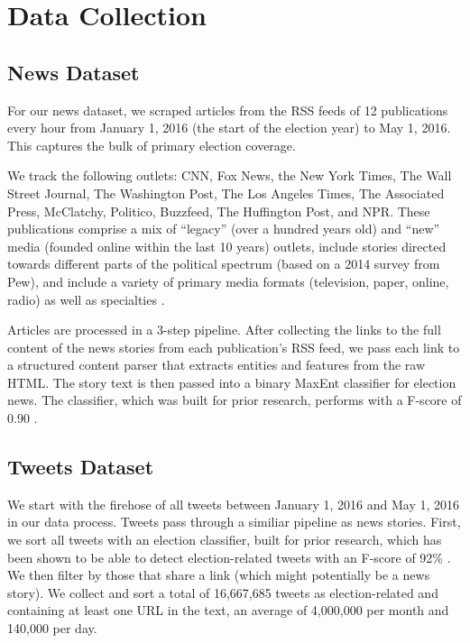 \documentclass[letterpaper]{article}
\begin{document}
\section{Data Collection} 

\subsection{News Dataset}
For our news dataset, we scraped articles from the RSS feeds of 12 publications every hour from January 1, 2016 (the start of the election year) to May 1, 2016. This captures the bulk of primary election coverage.

We track the following outlets: CNN, Fox News, the New York Times, The Wall Street Journal, The Washington Post, The Los Angeles Times, The Associated Press, McClatchy, Politico, Buzzfeed, The Huffington Post, and NPR. These publications comprise a mix of ``legacy'' (over a hundred years old) and ``new'' media (founded online within the last 10 years) outlets, include stories directed towards different parts of the political spectrum (based on a 2014 survey from Pew), and include a variety of primary media formats (television, paper, online, radio) as well as specialties \cite{PoliticalPolarization}.   

Articles are processed in a 3-step pipeline. After collecting the links to the full content of the news stories from each publication's RSS feed, we pass each link to a structured content parser that extracts entities and features from the raw HTML. The story text is then passed into a binary MaxEnt classifier for election news. The classifier, which was built for prior research, performs with a F-score of 0.90 \cite{vijayaraghavan-thesis}. 

\subsection{Tweets Dataset}
We start with the firehose of all tweets between January 1, 2016 and May 1, 2016 in our data process. Tweets pass through a similiar pipeline as news stories. First, we sort all tweets with an election classifier, built for prior research, which has been shown to be able to detect election-related tweets with an F-score of 92\% \cite{vvr_electome2016}. We then filter by those that share a link (which might potentially be a news story). We collect and sort a total of 16,667,685 tweets as election-related and containing at least one URL in the text, an average of 4,000,000 per month and 140,000 per day.
\end{document}
